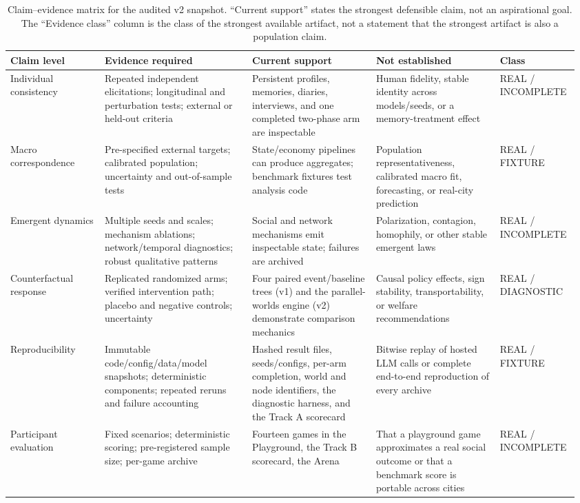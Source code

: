 \begin{table}[t]
\centering
\small
\caption{Claim--evidence matrix for the audited v2 snapshot.  ``Current
support'' states the strongest defensible claim, not an aspirational goal.
The ``Evidence class'' column is the class of the strongest available
artifact, not a statement that the strongest artifact is also a population
claim.}
\label{tab:claim-evidence}
\begin{tabular}{@{}p{0.16\linewidth}p{0.25\linewidth}p{0.21\linewidth}p{0.21\linewidth}p{0.13\linewidth}@{}}
\toprule
Claim level & Evidence required & Current support & Not established & Class \\
\midrule
Individual consistency & Repeated independent elicitations; longitudinal and perturbation tests; external or held-out criteria & Persistent profiles, memories, diaries, interviews, and one completed two-phase arm are inspectable & Human fidelity, stable identity across models/seeds, or a memory-treatment effect & \textsf{REAL} / \textsf{INCOMPLETE} \\
Macro correspondence & Pre-specified external targets; calibrated population; uncertainty and out-of-sample tests & State/economy pipelines can produce aggregates; benchmark fixtures test analysis code & Population representativeness, calibrated macro fit, forecasting, or real-city prediction & \textsf{REAL} / \textsf{FIXTURE} \\
Emergent dynamics & Multiple seeds and scales; mechanism ablations; network/temporal diagnostics; robust qualitative patterns & Social and network mechanisms emit inspectable state; failures are archived & Polarization, contagion, homophily, or other stable emergent laws & \textsf{REAL} / \textsf{INCOMPLETE} \\
Counterfactual response & Replicated randomized arms; verified intervention path; placebo and negative controls; uncertainty & Four paired event/baseline trees (v1) and the parallel-worlds engine (v2) demonstrate comparison mechanics & Causal policy effects, sign stability, transportability, or welfare recommendations & \textsf{REAL} / \textsf{DIAGNOSTIC} \\
Reproducibility & Immutable code/config/data/model snapshots; deterministic components; repeated reruns and failure accounting & Hashed result files, seeds/configs, per-arm completion, world and node identifiers, the diagnostic harness, and the Track A scorecard & Bitwise replay of hosted LLM calls or complete end-to-end reproduction of every archive & \textsf{REAL} / \textsf{FIXTURE} \\
Participant evaluation & Fixed scenarios; deterministic scoring; pre-registered sample size; per-game archive & Fourteen games in the Playground, the Track B scorecard, the Arena & That a playground game approximates a real social outcome or that a benchmark score is portable across cities & \textsf{REAL} / \textsf{INCOMPLETE} \\
\bottomrule
\end{tabular}
\end{table}

